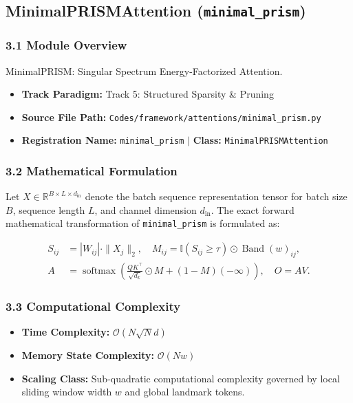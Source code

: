 \subsection{MinimalPRISMAttention (\texttt{minimal\_prism})}
\label{sec:app_module_minimal_prism}

\subsubsection*{3.1 Module Overview}
MinimalPRISM: Singular Spectrum Energy-Factorized Attention.
\begin{itemize}
    \item \textbf{Track Paradigm:} Track 5: Structured Sparsity \& Pruning
    \item \textbf{Source File Path:} \texttt{Codes/framework/attentions/minimal\_prism.py}
    \item \textbf{Registration Name:} \texttt{minimal\_prism} $\mid$ \textbf{Class:} \texttt{MinimalPRISMAttention}
\end{itemize}

\subsubsection*{3.2 Mathematical Formulation}
Let $X \in \mathbb{R}^{B \times L \times d_{\text{in}}}$ denote the batch sequence representation tensor for batch size $B$, sequence length $L$, and channel dimension $d_{\text{in}}$. The exact forward mathematical transformation of \texttt{minimal\_prism} is formulated as:

\begin{align}
S_{ij} &= |W_{ij}| \cdot \|X_j\|_2, \quad M_{ij} = \mathbb{I}(S_{ij} \ge \tau) \odot \operatorname{Band}(w)_{ij}, \\
A &= \operatorname{softmax}\left(\frac{Q K^\top}{\sqrt{d_k}} \odot M + (1 - M)(-\infty)\right), \quad O = A V.
\end{align}


\subsubsection*{3.3 Computational Complexity}
\begin{itemize}
    \item \textbf{Time Complexity:} $\mathcal{O}(N \sqrt{N} d)$
    \item \textbf{Memory State Complexity:} $\mathcal{O}(N w)$
    \item \textbf{Scaling Class:} Sub-quadratic computational complexity governed by local sliding window width $w$ and global landmark tokens.
\end{itemize}

